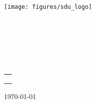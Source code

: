 
\begin{titlepage}

	\begin{center}
	\texttt{[image: figures/sdu\_logo]}\\

	\vspace{0.3cm}
	\textbf{\institute}\\

	\textmd{\department}\\
	\textmd{\program}  %

	\\[4cm]

	\vspace{0.4cm}
	{\huge \bfseries \documentTitle}
	\\
	\vspace{0.5cm}
	{\large \documentType}
	\\[2cm]

	\begin{tabular}{c}
	 \makebox[4cm]{\emph{Authors}} \\
	 \makebox[4cm]{\authorOne} \\
	 \makebox[4cm]{\authorTwo} \\
	\end{tabular}

	\vfill
	{\large \today}
	\end{center}


\end{titlepage}
